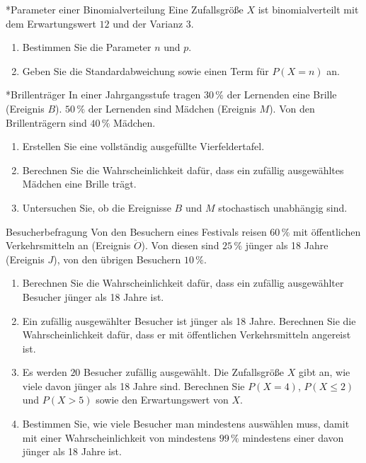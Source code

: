 \begin{uebung}*{Parameter einer Binomialverteilung}
Eine Zufallsgröße $X$ ist binomialverteilt mit dem Erwartungswert $12$ und der Varianz $3$.
\begin{enumerate}[label=\alph*)]
  \item Bestimmen Sie die Parameter $n$ und $p$.
  \item Geben Sie die Standardabweichung sowie einen Term für $P(X=n)$ an.
\end{enumerate}
\end{uebung}

\begin{uebung}*{Brillenträger}
In einer Jahrgangsstufe tragen $30\,\%$ der Lernenden eine Brille (Ereignis $B$). $50\,\%$ der Lernenden sind Mädchen (Ereignis $M$). Von den Brillenträgern sind $40\,\%$ Mädchen.
\begin{enumerate}[label=\alph*)]
  \item Erstellen Sie eine vollständig ausgefüllte Vierfeldertafel.
  \item Berechnen Sie die Wahrscheinlichkeit dafür, dass ein zufällig ausgewähltes Mädchen eine Brille trägt.
  \item Untersuchen Sie, ob die Ereignisse $B$ und $M$ stochastisch unabhängig sind.
\end{enumerate}
\end{uebung}


\begin{uebung}{Besucherbefragung}
Von den Besuchern eines Festivals reisen $60\,\%$ mit öffentlichen Verkehrsmitteln an (Ereignis $\ddot{O}$). Von diesen sind $25\,\%$ jünger als 18 Jahre (Ereignis $J$), von den übrigen Besuchern $10\,\%$.
\begin{enumerate}[label=\alph*)]
  \item Berechnen Sie die Wahrscheinlichkeit dafür, dass ein zufällig ausgewählter Besucher jünger als 18 Jahre ist.
  \item Ein zufällig ausgewählter Besucher ist jünger als 18 Jahre. Berechnen Sie die Wahrscheinlichkeit dafür, dass er mit öffentlichen Verkehrsmitteln angereist ist.
  \item Es werden $20$ Besucher zufällig ausgewählt. Die Zufallsgröße $X$ gibt an, wie viele davon jünger als 18 Jahre sind. Berechnen Sie $P(X=4)$, $P(X\leq 2)$ und $P(X>5)$ sowie den Erwartungswert von $X$.
  \item Bestimmen Sie, wie viele Besucher man mindestens auswählen muss, damit mit einer Wahrscheinlichkeit von mindestens $99\,\%$ mindestens einer davon jünger als 18 Jahre ist.
\end{enumerate}
\end{uebung}

